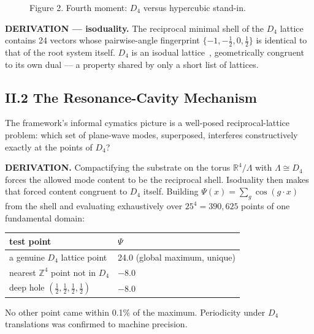 \documentclass[11pt,a4paper]{article}
\begin{document}
\begin{figure}[h]
\centering
{}
\caption{Figure 2. Fourth moment: $D_4$ versus hypercubic stand-in.}
\end{figure}

\textbf{DERIVATION --- isoduality.} The reciprocal minimal shell of the $D_4$ lattice contains 24 vectors whose pairwise-angle fingerprint $\{-1, -\tfrac{1}{2}, 0, \tfrac{1}{2}\}$ is identical to that of the root system itself. $D_4$ is an isodual lattice~\cite{conway1999}, geometrically congruent to its own dual --- a property shared by only a short list of lattices.

\subsection{II.2 The Resonance-Cavity Mechanism}
The framework's informal cymatics picture is a well-posed reciprocal-lattice problem: which set of plane-wave modes, superposed, interferes constructively exactly at the points of $D_4$?

\textbf{DERIVATION.} Compactifying the substrate on the torus $\mathbb{R}^4/\Lambda$ with $\Lambda \cong D_4$ forces the allowed mode content to be the reciprocal shell. Isoduality then makes that forced content congruent to $D_4$ itself. Building $\Psi(x) = \sum_g \cos(g \cdot x)$ from the shell and evaluating exhaustively over $25^4 = 390{,}625$ points of one fundamental domain:
\begin{center}
\begin{tabular}{ll}
\toprule
test point & $\Psi$ \\
\midrule
a genuine $D_4$ lattice point & 24.0 (global maximum, unique) \\
nearest $\mathbb{Z}^4$ point not in $D_4$ & $-8.0$ \\
deep hole $(\tfrac12,\tfrac12,\tfrac12,\tfrac12)$ & $-8.0$ \\
\bottomrule
\end{tabular}
\end{center}
No other point came within 0.1\% of the maximum. Periodicity under $D_4$ translations was confirmed to machine precision.
\end{document}
